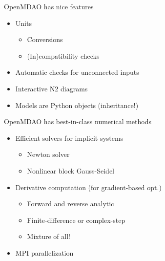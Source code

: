 \documentclass[aspectratio=169, usenames,dvipsnames, 14pt]{beamer}
\begin{document}
\begin{frame}{OpenMDAO has nice features}
    \begin{itemize}
        \item Units
          \begin{itemize}
              \item Conversions
              \item (In)compatibility checks
          \end{itemize}
\pause
\vspace{.5cm}
        \item Automatic checks for unconnected inputs
\pause
\vspace{.5cm}
        \item Interactive N2 diagrams
\pause
\vspace{.5cm}
        \item Models are Python objects (inheritance!)
    \end{itemize}
\end{frame}

\begin{frame}{OpenMDAO has best-in-class numerical methods}
    \begin{itemize}
        \item Efficient solvers for implicit systems
        \begin{itemize}
            \item Newton solver
            \item Nonlinear block Gauss-Seidel
        \end{itemize}
\pause
\vspace{0.5cm}
        \item Derivative computation (for gradient-based opt.)
        \begin{itemize}
            \item Forward and reverse analytic
            \item Finite-difference or complex-step
            \item Mixture of all!
            \end{itemize}
\pause
\vspace{0.5cm}
        \item MPI parallelization
    \end{itemize}
    
\end{frame}
\end{document}
